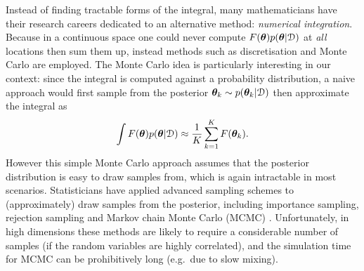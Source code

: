 Instead of finding tractable forms of the integral, many mathematicians have their research careers dedicated to an alternative method: \emph{numerical integration}. Because in a continuous space one could never compute $F(\bm{\theta})p(\bm{\theta} | \mathcal{D})$ at \emph{all} locations then sum them up, instead methods such as discretisation and Monte Carlo are employed. The Monte Carlo idea is particularly interesting in our context: since the integral is computed against a probability distribution, a naive approach would first sample from the posterior $\bm{\theta}_k \sim p(\bm{\theta}_k | \mathcal{D})$ then approximate the integral as
\begin{equation}
\int F(\bm{\theta}) p(\bm{\theta} | \mathcal{D}) \approx \frac{1}{K} \sum_{k=1}^K F(\bm{\theta}_k).
\end{equation}
However this simple Monte Carlo approach assumes that the posterior distribution is easy to draw samples from, which is again intractable in most scenarios. Statisticians have applied advanced sampling schemes to (approximately) draw samples from the posterior, including importance sampling, rejection sampling and Markov chain Monte Carlo (MCMC) \citep{gelman:dep2014}. Unfortunately, in high dimensions these methods are likely to require a considerable number of samples (if the random variables are highly correlated), and the simulation time for MCMC can be prohibitively long (e.g.~due to slow mixing).

